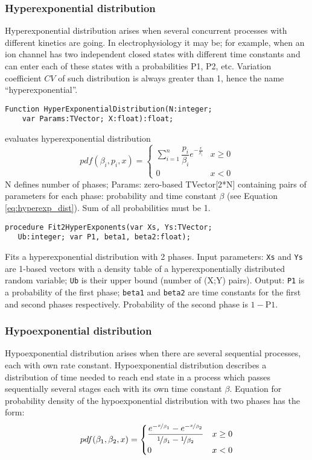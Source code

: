 \documentclass[12pt,a4paper,oneside]{article}
\newcommand{\code}[1]{\texttt{#1}}
\begin{document}
\subsubsection{Hyperexponential distribution}
Hyperexponential distribution arises when several concurrent processes with different kinetics are going. In electrophysiology it may be; for example, when an ion channel has two independent closed states with different time constants and can enter each of these states with a probabilities P1, P2, etc. Variation coefficient $CV$ of such distribution is always greater than 1, hence the name ``hyperexponential''.
\begin{verbatim}
Function HyperExponentialDistribution(N:integer; 
    var Params:TVector; X:float):float;
\end{verbatim}\vspace{-6pt}
evaluates hyperexponential distribution
\begin{equation}
pdf(\beta_i,p_i,x) = 
\begin{cases}
\displaystyle\sum_{i=1}^n \dfrac{p_i}{\beta_i} e^{-\frac{x}{\beta_i}} & x \geq 0 \\
0 & x < 0
\end{cases}
\label{eq:hyperexp_dist}
\end{equation}
N defines number of phases; Params: zero-based TVector[2*N] containing pairs of parameters for each phase: probability and time constant $\beta$ (see Equation \ref{eq:hyperexp_dist}). Sum of all probabilities must be 1. 
\begin{verbatim}
procedure Fit2HyperExponents(var Xs, Ys:TVector; 
   Ub:integer; var P1, beta1, beta2:float);
\end{verbatim}
Fits a hyperexponential distribution with 2 phases. Input parameters: \code{Xs} and \code{Ys} are 1-based vectors with a density table of a hyperexponentially distributed random variable; \code{Ub} is their upper bound (number of (X;Y) pairs). Output: \code{P1} is a probability of the first phase; \code{beta1} and \code{beta2} are time constants for the first and second phases respectively. Probability of the second phase is $1-\mathrm{P}1$.
\subsubsection{Hypoexponential distribution}
Hypoexponential distribution arises when there are several sequential processes, each with own rate constant. Hypoexponential distribution describes a distribution of time needed to reach end state in a process which passes sequentially several stages each with its own time constant $\beta$. Equation for probability density of the hypoexponential distribution with two phases has the form:
\begin{equation}
	pdf(\beta_1,\beta_2, x) = 
	\begin{cases}
		\dfrac{e^{-\nicefrac{x}{\beta_1}}-e^{-\nicefrac{x}{\beta_2}}}{\nicefrac{1}{\beta_1}-\nicefrac{1}{\beta_2}} & x \geq 0 \\
		0 & x<0
	\end{cases}
\end{equation}
   
\end{document}
